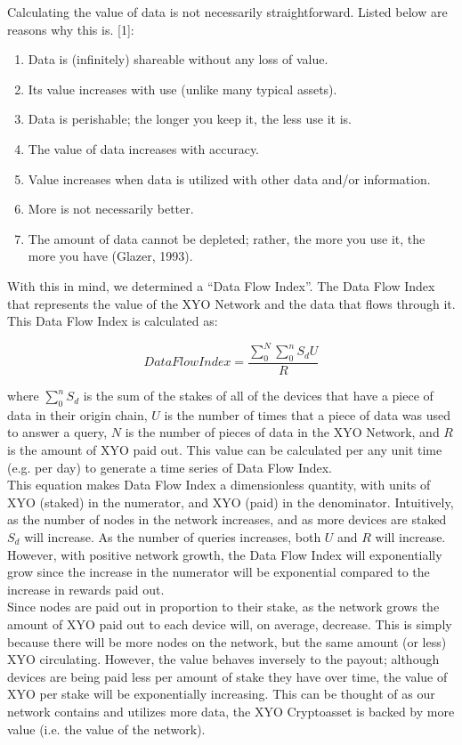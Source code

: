 \documentclass{article}
\begin{document}
Calculating the value of data is not necessarily straightforward. Listed below are reasons why this is. [1]:

\begin{enumerate}
  \item Data is (infinitely) shareable without any loss of value.
  \item Its value increases with use (unlike many typical assets).
  \item Data is perishable; the longer you keep it, the less use it is.
  \item The value of data increases with accuracy.
  \item Value increases when data is utilized with other data and/or information.
  \item More is not necessarily better.
  \item The amount of data cannot be depleted; rather, the more you use it, the more you have (Glazer, 1993).
\end{enumerate}
With this in mind, we determined a ``Data Flow Index''. The Data Flow Index that represents the value of the XYO Network and the data that flows through it. This Data Flow Index is calculated as:

\begin{equation}
Data Flow Index = \frac{\sum_{0}^{N}\sum_{0}^{n}S_dU}{R}
\end{equation}

where $\sum^{n}_{0}{S_d}$ is the sum of the stakes of all of the devices that have a piece of data in their origin chain, $U$ is the number of times that a piece of data was used to answer a query, $N$ is the number of pieces of data in the XYO Network, and $R$ is the amount of XYO paid out. This value can be calculated per any unit time (e.g. per day) to generate a time series of Data Flow Index. \\
This equation makes Data Flow Index a dimensionless quantity, with units of XYO (staked) in the numerator, and XYO (paid) in the denominator. Intuitively, as the number of nodes in the network increases, and as more devices are staked $S_d$ will increase. As the number of queries increases, both $U$ and $R$ will increase. However, with positive network growth, the Data Flow Index will exponentially grow since the increase in the numerator will be exponential compared to the increase in rewards paid out.\\
Since nodes are paid out in proportion to their stake, as the network grows the amount of XYO paid out to each device will, on average, decrease. This is simply because there will be more nodes on the network, but the same amount (or less) XYO circulating. However, the value behaves inversely to the payout; although devices are being paid less per amount of stake they have over time, the value of XYO per stake will be exponentially increasing. This can be thought of as our network contains and utilizes more data, the XYO Cryptoasset is backed by more value (i.e. the value of the network).
\end{document}
